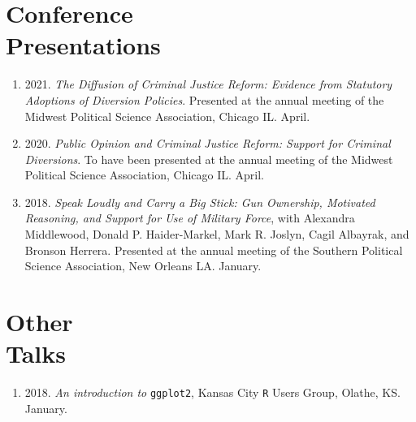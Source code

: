 \documentclass[margin,line,pifont,palatino,courier]{res}
\begin{document}
\begin{resume}




\section{\sc Conference \\ Presentations}

\begin{enumerate}

\item 2021. \emph{The Diffusion of Criminal Justice Reform: Evidence
    from Statutory Adoptions of Diversion Policies}. Presented at
  the annual meeting of the Midwest Political Science Association,
  Chicago IL. April.

\item 2020. \emph{Public Opinion and Criminal Justice Reform: Support for
  Criminal Diversions}. To have been presented at the annual meeting of
the Midwest Political Science Association, Chicago IL. April.

\item 2018. \emph{Speak Loudly and Carry a Big Stick: Gun Ownership, Motivated
  Reasoning, and Support for Use of Military Force}, with Alexandra
Middlewood, Donald P. Haider-Markel, Mark R. Joslyn, Cagil Albayrak,
and Bronson Herrera. Presented at the annual meeting of the Southern
Political Science Association, New Orleans LA. January.
\end{enumerate}

\section{\sc Other\\ Talks}

\begin{enumerate}
\item 2018. \emph{An introduction to} \verb+ggplot2+, Kansas City \verb+R+ Users Group,
Olathe, KS. January.
\end{enumerate}


\end{resume}
\end{document}
